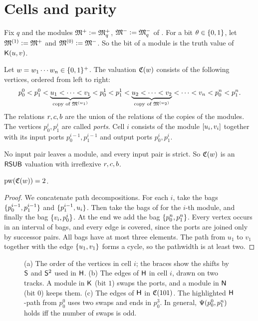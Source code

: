 \section{Cells and parity}\label{section: cells}

Fix $q$ and the modules $\mathfrak{M}^{+} \mathrel{\vcentcolon=} \mathfrak{M}^{+}_q$, $\mathfrak{M}^{-} \mathrel{\vcentcolon=} \mathfrak{M}^{-}_q$ of .
For a bit $\theta \in \{0, 1\}$, let $\mathfrak{M}^{(1)} \mathrel{\vcentcolon=} \mathfrak{M}^{+}$ and $\mathfrak{M}^{(0)} \mathrel{\vcentcolon=} \mathfrak{M}^{-}$.
So the bit of a module is the truth value of $\mathsf{K}(u, v)$.

\begin{definition}\label{definition: cells}
  Let $w = w_1 \cdots w_n \in \{0,1\}^{+}$.
  The valuation $\mathfrak{C}(w)$ consists of the following vertices, ordered from left to right:
  \[
    p^{0}_{0} < p^{0}_{1} < \underbrace{u_1 < \cdots < v_1}_{\text{copy of } \mathfrak{M}^{(w_1)}} < p^{1}_{0} < p^{1}_{1} < \underbrace{u_2 < \cdots < v_2}_{\text{copy of } \mathfrak{M}^{(w_2)}} < \cdots < v_n < p^{n}_{0} < p^{n}_{1}.
  \]
  The relations $r, c, b$ are the union of the relations of the copies of the modules.
  The vertices $p^{i}_{0}, p^{i}_{1}$ are called \emph{ports}.
  Cell $i$ consists of the module $[u_i, v_i]$ together with its input ports $p^{i-1}_{0}, p^{i-1}_{1}$ and output ports $p^{i}_{0}, p^{i}_{1}$.
\end{definition}

No input pair leaves a module, and every input pair is strict.
So $\mathfrak{C}(w)$ is an $\mathsf{RSUB}$ valuation with irreflexive $r, c, b$.

\begin{lemma}\label{lemma: cells pathwidth}
  $\mathrm{pw}(\mathfrak{C}(w)) = 2$.
\end{lemma}
\begin{proof}
  We concatenate path decompositions.
  For each $i$, take the bags $\{p^{i-1}_0, p^{i-1}_1\}$ and $\{p^{i-1}_1, u_i\}$.
  Then take the bags of  for the $i$-th module, and finally the bag $\{v_i, p^{i}_0\}$.
  At the end we add the bag $\{p^{n}_0, p^{n}_1\}$.
  Every vertex occurs in an interval of bags, and every edge is covered, since the ports are joined only by successor pairs.
  All bags have at most three elements.
  The path from $u_1$ to $v_1$ together with the edge $\{u_1, v_1\}$ forms a cycle, so the pathwidth is at least two.
\end{proof}

\begin{figure}[t]
  \centering
  
  \caption{(a) The order of the vertices in cell $i$; the braces show the shifts by $\mathsf{S}$ and $\mathsf{S}^{2}$ used in $\mathsf{H}$.
    (b) The edges of $\mathsf{H}$ in cell $i$, drawn on two tracks.
    A module in $\mathsf{K}$ (bit $1$) swaps the ports, and a module in $\mathsf{N}$ (bit $0$) keeps them.
    (c) The edges of $\mathsf{H}$ in $\mathfrak{C}(101)$.
    The highlighted $\mathsf{H}$-path from $p^{0}_{0}$ uses two swaps and ends in $p^{3}_{0}$.
    In general, $\Psi(p^{0}_{0}, p^{n}_{1})$ holds iff the number of swaps is odd.}
  \label{figure: cells}
\end{figure}

